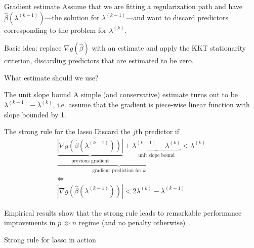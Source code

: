 \documentclass[10pt,ignorenonframetext]{beamer}
\begin{document}
\begin{frame}{Gradient estimate}
Assume that we are fitting a regularization \alert{path} and have
\(\hat\beta(\lambda^{(k-1)})\)---the solution for \(\lambda^{(k-1)}\)---and want
to discard predictors corresponding to the problem for \(\lambda^{(k)}\).\medskip

Basic idea: replace \(\nabla g(\hat\beta)\) with an estimate and apply the
KKT stationarity criterion, discarding predictors that are estimated to be zero.\medskip

What estimate should we use?\medskip
\end{frame}

\begin{frame}{The unit slope bound}
A simple (and conservative) estimate turns out to be \(\lambda^{(k-1)} - \lambda^{(k)}\),
i.e. assume that the gradient is piece-wise linear function with slope bounded by 1.

\centering

\end{frame}

\begin{frame}{The strong rule for the lasso}
Discard the \(j\)th predictor if
\[
\begin{gathered}
\underbrace{\underbrace{\left| \nabla g\left(\hat\beta(\lambda^{(k-1)})\right) \right|}_\text{previous gradient} + \underbrace{\lambda^{(k-1)} - \lambda^{(k)}}_\text{unit slope bound}}_\text{gradient prediction for \(k\)} < \lambda^{(k)}\\
\iff\\
\left| \nabla g\left(\hat\beta(\lambda^{(k-1)})\right) \right| < 2\lambda^{(k)} - \lambda^{(k-1)}
\end{gathered}
\]

Empirical results show that the strong rule leads to remarkable
performance improvements in \(p \gg n\) regime (and no penalty otherwise)~\autocite{tibshirani2012}.

\end{frame}

\begin{frame}[fragile]{Strong rule for lasso in action}
\begin{figure}
    \centering
    
\end{figure}
\end{frame}
\end{document}
